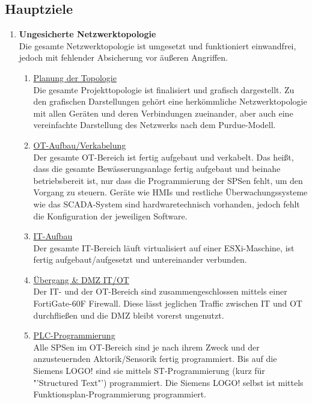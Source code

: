 \documentclass[
	headings=optiontotocandhead,%
	oneside,
	numbers=noenddot,%
	toc=flat, %
	10pt, %
	parskip=full, %
	listof=totoc, %
	listof=flat, %
	numbers=noenddot, %
	bibliography=totoc, %
	a4paper,DIV=14,
]{scrartcl}
\begin{document}
\subsection{Hauptziele}
\begin{enumerate}[start=1,label={\bfseries Ziel-H \arabic*},leftmargin=*,wide]
\item{\bfseries{Ungesicherte Netzwerktopologie}}\\
Die gesamte Netzwerktopologie ist umgesetzt und funktioniert einwandfrei, jedoch mit fehlender Absicherung vor äußeren Angriffen.
\begin{enumerate}[label=\alph*.]
\item{\underline{Planung der Topologie}}\\
Die gesamte Projekttopologie ist finalisiert und grafisch dargestellt. Zu den grafischen Darstellungen gehört eine herkömmliche Netzwerktopologie mit allen Geräten und deren Verbindungen zueinander, aber auch eine vereinfachte Darstellung des Netzwerks nach dem Purdue-Modell.

\item{\underline{OT-Aufbau/Verkabelung}}\\
Der gesamte OT-Bereich ist fertig aufgebaut und verkabelt. Das heißt, dass die gesamte Bewässerungsanlage fertig aufgebaut und beinahe betriebsbereit ist, nur dass die Programmierung der SPSen fehlt, um den Vorgang zu steuern. Geräte wie HMIs und restliche Überwachungssysteme wie das SCADA-System sind hardwaretechnisch vorhanden, jedoch fehlt die Konfiguration der jeweiligen Software.

\item{\underline{IT-Aufbau}}\\
Der gesamte IT-Bereich läuft virtualisiert auf einer ESXi-Maschine, ist fertig aufgebaut/aufgesetzt und untereinander verbunden.

\item{\underline{Übergang \& DMZ IT/OT}}\\
Der IT- und der OT-Bereich sind zusammengeschlossen mittels einer FortiGate-60F Firewall. Diese lässt jeglichen Traffic zwischen IT und OT durchfließen und die DMZ bleibt vorerst ungenutzt.

\item{\underline{PLC-Programmierung}}\\
Alle SPSen im OT-Bereich sind je nach ihrem Zweck und der anzusteuernden Aktorik/Sensorik fertig programmiert. Bis auf die Siemens LOGO! sind sie mittels ST-Programmierung (kurz für "'Structured Text"') programmiert. Die Siemens LOGO! selbst ist mittels Funktionsplan-Programmierung programmiert.


\end{enumerate}
\end{enumerate}
\end{document}
